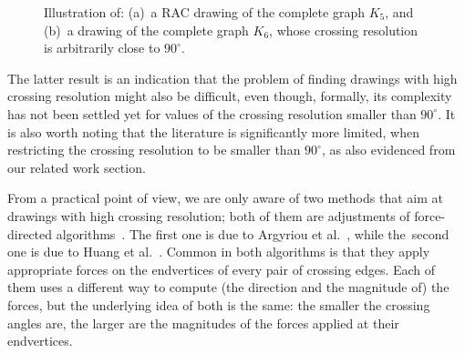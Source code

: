 \documentclass{comjnl}
\begin{document}
\begin{figure}[t!]
	\hfil
	\caption{Illustration of: %
	(a)~a RAC drawing of the complete graph $K_5$, and
	(b)~a drawing of the complete graph $K_6$, whose crossing resolution is arbitrarily close to $90^\circ$.}
	\label{fig:examples}
\end{figure}

The latter result is an indication that the problem of finding drawings with high crossing resolution might also be difficult, even though, formally, its complexity has not been settled yet for values of the crossing resolution smaller than $90^\circ$. It is also worth noting that the literature is significantly more limited, when restricting the crossing resolution to be smaller than $90^\circ$, as also evidenced from our related work section.

From a practical point of view, we are only aware of two methods that aim at drawings with high crossing resolution; both of them are adjustments of force-directed algorithms~\cite{DBLP:journals/congnum/Eades84}. The first one is due to Argyriou et al.~\cite{DBLP:journals/cj/ArgyriouBS13}, while the~second one is due to Huang et al.~\cite{DBLP:journals/vlc/HuangEHL13}. Common in both algorithms is that they apply appropriate forces on the endvertices of every pair of crossing edges. Each of them uses a different way to compute (the direction and the magnitude of) the forces, but the underlying idea of both is the same: the smaller the crossing angles are, the larger are the magnitudes of the forces applied at their endvertices.
\end{document}
